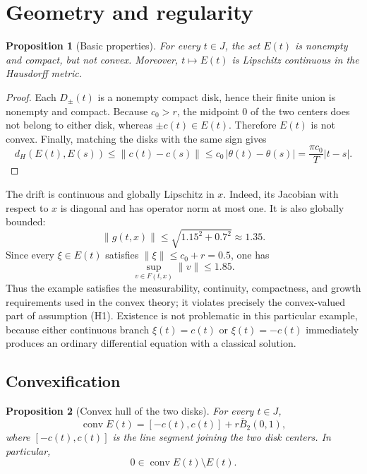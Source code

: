 \documentclass[11pt]{article}
\newtheorem{proposition}{Proposition}[section]
\newcommand{\B}{\overline{B}_2(0,1)}
\newcommand{\conv}{\operatorname{conv}}
\begin{document}
\section{Geometry and regularity}

\begin{proposition}[Basic properties]
For every $t\in J$, the set $E(t)$ is nonempty and compact, but not convex. Moreover, $t\mapsto E(t)$ is Lipschitz continuous in the Hausdorff metric.
\end{proposition}

\begin{proof}
Each $D_\pm(t)$ is a nonempty compact disk, hence their finite union is nonempty and compact. Because $c_0>r$, the midpoint $0$ of the two centers does not belong to either disk, whereas $\pm c(t)\in E(t)$. Therefore $E(t)$ is not convex. Finally, matching the disks with the same sign gives
\begin{equation}
    d_H(E(t),E(s))
    \leq \lVert c(t)-c(s)\rVert
    \leq c_0\,|\theta(t)-\theta(s)|
    =\frac{\pi c_0}{T}|t-s|.
\end{equation}
\end{proof}

The drift is continuous and globally Lipschitz in $x$. Indeed, its Jacobian with respect to $x$ is diagonal and has operator norm at most one. It is also globally bounded:
\begin{equation}
    \lVert g(t,x)\rVert
    \leq \sqrt{1.15^2+0.7^2}
    \approx 1.35.
    \label{eq:g_bound}
\end{equation}
Since every $\xi\in E(t)$ satisfies $\lVert\xi\rVert\leq c_0+r=0.5$, one has
\begin{equation}
    \sup_{v\in F(t,x)}\lVert v\rVert\leq 1.85.
    \label{eq:F_bound}
\end{equation}
Thus the example satisfies the measurability, continuity, compactness, and growth requirements used in the convex theory; it violates precisely the convex-valued part of assumption (H1). Existence is not problematic in this particular example, because either continuous branch $\xi(t)=c(t)$ or $\xi(t)=-c(t)$ immediately produces an ordinary differential equation with a classical solution.

\subsection{Convexification}

\begin{proposition}[Convex hull of the two disks]
For every $t\in J$,
\begin{equation}
    \conv E(t)=[-c(t),c(t)]+r\B,
    \label{eq:convE}
\end{equation}
where $[-c(t),c(t)]$ is the line segment joining the two disk centers. In particular,
\begin{equation}
    0\in\conv E(t)\setminus E(t).
\end{equation}
\end{proposition}
\end{document}
